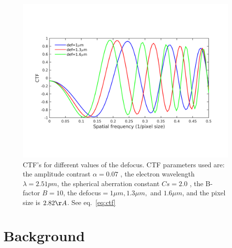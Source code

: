 \begin{figure}
\begin{center}

\includegraphics[scale=0.8]{figures/ctfeg_fig.png}

\caption{CTF's for different values of the defocus. CTF parameters used are: the amplitude contrast $\alpha = 0.07$
, the electron wavelength $\lambda= 2.51pm$, the spherical aberration constant $Cs=2.0$
, the B-factor $B=10$, the defocus$=1\mu m, 1.3\mu m,$ and
$1.6\mu m$, and the pixel size is $2.82\AA$. See 
eq.~\eqref{eq:ctf}}\label{fig:ctf}
\end{center}

\end{figure}
 

\section{Background}
\label{sec:section2}
